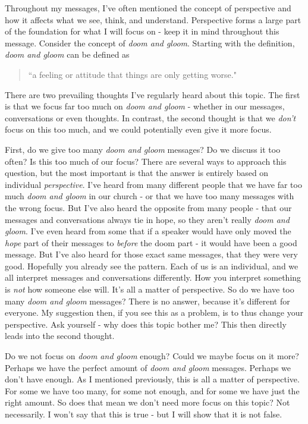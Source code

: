 \documentclass[10pt]{article}
\begin{document}
\begin{multicols}{2}

Throughout my messages, I've often mentioned the concept of perspective and how it affects what we see, think, and understand. Perspective forms a large part of the foundation for what I will focus on - keep it in mind throughout this message. Consider the concept of \textit{doom and gloom}. Starting with the definition, \textit{doom and gloom} can be defined as 

\begin{quotation}
	``a feeling or attitude that things are only getting worse." \cite{Dictionary}
\end{quotation}

There are two prevailing thoughts I've regularly heard about this topic. The first is that we focus far too much on \textit{doom and gloom} - whether in our messages, conversations or even thoughts. In contrast, the second thought is that we \textit{don't} focus on this too much, and we could potentially even give it more focus.

First, do we give too many \textit{doom and gloom} messages? Do we discuss it too often? Is this too much of our focus? There are several ways to approach this question, but the most important is that the answer is entirely based on individual \textit{perspective}. I've heard from many different people that we have far too much \textit{doom and gloom} in our church - or that we have too many messages with the wrong focus. But I've also heard the opposite from many people - that our messages and conversations always tie in hope, so they aren't really \textit{doom and gloom}. I've even heard from some that if a speaker would have only moved the \textit{hope} part of their messages to \textit{before} the doom part - it would have been a good message. But I've also heard for those exact same messages, that they were very good. Hopefully you already see the pattern. Each of us is an individual, and we all interpret messages and conversations differently. How you interpret something is \textit{not} how someone else will. It's all a matter of perspective. So do we have too many \textit{doom and gloom} messages? There is no answer, because it's different for everyone. My suggestion then, if you see this as a problem, is to thus change your perspective. Ask yourself - why does this topic bother me? This then directly leads into the second thought.

Do we not focus on \textit{doom and gloom} enough? Could we maybe focus on it more? Perhaps we have the perfect amount of \textit{doom and gloom} messages. Perhaps we don't have enough. As I mentioned previously, this is all a matter of perspective. For some we have too many, for some not enough, and for some we have just the right amount. So does that mean we don’t need more focus on this topic? Not necessarily. I won't say that this is true - but I will show that it is not false.


\end{multicols}
\end{document}
